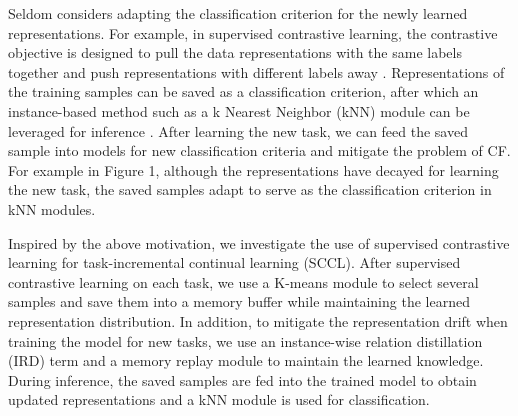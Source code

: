 Seldom considers adapting the classification criterion for the newly learned representations.
For example,  in supervised contrastive learning, the contrastive objective is designed to pull the data representations with the same labels together and push representations with different labels away \cite{Chen2020,gao-etal-2021-simcse,zhang-etal-2021-pairwise,neelakantan2022text,zhaoconsistent}. Representations of the training samples can be saved as a classification criterion, after which an instance-based method such as  a k Nearest Neighbor (kNN) module  can be leveraged for inference \cite{kassnerbert,khandelwal2020nearest}. After learning the new task, we can feed the saved sample into models for new classification criteria and mitigate the problem of CF. For example in Figure 1, although the representations have decayed for learning the new task, the saved samples adapt to serve as the classification criterion in kNN modules.



Inspired by the above motivation, we investigate the use of supervised contrastive learning for task-incremental continual learning (SCCL). After supervised contrastive learning on each task, we use a K-means module to select several samples and save them into a memory buffer while maintaining the  learned representation distribution.  In addition, to mitigate the representation drift when training the model for new tasks, we use an instance-wise relation distillation (IRD) term \cite{fang2020seed,cha2021co2l} and a memory replay module \cite{de2019episodic} to maintain the learned knowledge.
During inference, the saved samples are fed into the trained model to obtain updated representations and a kNN module is used for classification.




